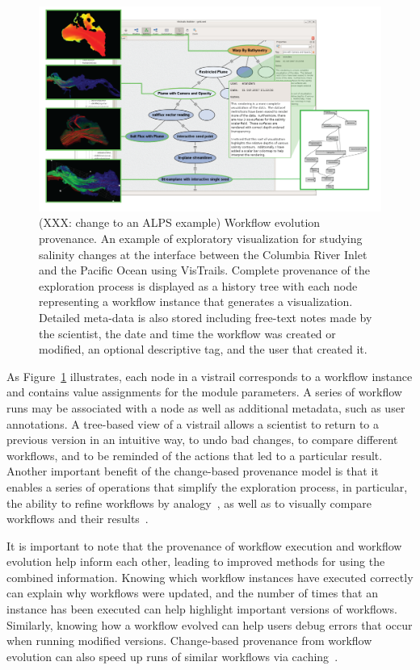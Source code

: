 \documentclass[12pt]{iopart}
\begin{document}
\begin{figure}[t]
\centering
\begin{center}
  \includegraphics[width = 0.75\linewidth,clip=false]{Figures/croos-tree-3.png}
\caption{(XXX: change to an ALPS example) Workflow evolution provenance. An example
    of exploratory visualization for studying salinity changes at the
    interface between the Columbia River Inlet and the Pacific Ocean
    using VisTrails.  Complete provenance of the exploration process
    is displayed as a history tree with each node representing a
    workflow instance that generates a visualization.  Detailed
    meta-data is also stored including free-text notes made by the
    scientist, the date and time the workflow was created or modified,
    an optional descriptive tag, and the user that created
    it.} \label{fig:cmop} \vspace{-.3cm}
\end{center}
\end{figure}

As Figure~\ref{fig:cmop} illustrates, each node in a vistrail
corresponds to a workflow instance and contains value assignments for
the module parameters. A series of workflow runs may be associated
with a node as well as additional metadata, such as user annotations.
A tree-based view of a vistrail allows a scientist to return to a
previous version in an intuitive way, to undo bad changes, to compare
different workflows, and to be reminded of the actions that led to a
particular result.  Another important benefit of the change-based
provenance model is that it enables a series of operations that
simplify the exploration process, in particular, the ability to refine
workflows by analogy~\cite{analogies@tvcg2007}, as well as to visually
compare workflows and their results~\cite{Freire:2006:IPAW}.

It is important to note that the provenance of workflow execution and
workflow evolution help inform each other, leading to improved methods
for using the combined information. Knowing which workflow instances
have executed correctly can explain why workflows were updated, and
the number of times that an instance has been executed can help
highlight important versions of workflows.  Similarly, knowing how a
workflow evolved can help users debug errors that occur when running
modified versions.  Change-based provenance from workflow evolution
can also speed up runs of similar workflows via
caching~\cite{bavoil@vis2005}.
\end{document}
